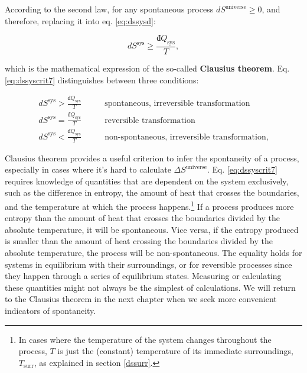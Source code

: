 \documentclass[
  9pt,
]{extbook}
\theoremstyle{definition}
\theoremstyle{definition}
\theoremstyle{definition}
\theoremstyle{remark}
\begin{document}
According to the second law, for any spontaneous process \(d S^{\mathrm{universe}}\geq0\), and therefore, replacing it into eq. \eqref{eq:dssysd}:

\begin{equation}
d S^{\mathrm{sys}} \geq \frac{đQ_{\text{sys}}}{T},
\label{eq:dssyscrit7}
\end{equation}

which is the mathematical expression of the so-called \textbf{Clausius theorem}. Eq. \eqref{eq:dssyscrit7} distinguishes between three conditions:

\begin{equation}
\begin{aligned}
d S^{\mathrm{sys}} > \frac{đQ_{\text{sys}}}{T} \qquad &\text{spontaneous, irreversible transformation} \\
d S^{\mathrm{sys}} = \frac{đQ_{\text{sys}}}{T} \qquad &\text{reversible transformation} \\
d S^{\mathrm{sys}} < \frac{đQ_{\text{sys}}}{T} \qquad &\text{non-spontaneous, irreversible transformation}, 
\end{aligned}
\label{eq:dssyscond}
\end{equation}

Clausius theorem provides a useful criterion to infer the spontaneity of a process, especially in cases where it's hard to calculate \(\Delta S^{\mathrm{universe}}\). Eq. \eqref{eq:dssyscrit7} requires knowledge of quantities that are dependent on the system exclusively, such as the difference in entropy, the amount of heat that crosses the boundaries, and the temperature at which the process happens.\footnote{In cases where the temperature of the system changes throughout the process, \(T\) is just the (constant) temperature of its immediate surroundings, \(T_{\text{surr}}\), as explained in section \ref{dssurr}.} If a process produces more entropy than the amount of heat that crosses the boundaries divided by the absolute temperature, it will be spontaneous. Vice versa, if the entropy produced is smaller than the amount of heat crossing the boundaries divided by the absolute temperature, the process will be non-spontaneous. The equality holds for systems in equilibrium with their surroundings, or for reversible processes since they happen through a series of equilibrium states. Measuring or calculating these quantities might not always be the simplest of calculations. We will return to the Clausius theorem in the next chapter when we seek more convenient indicators of spontaneity.
\end{document}
